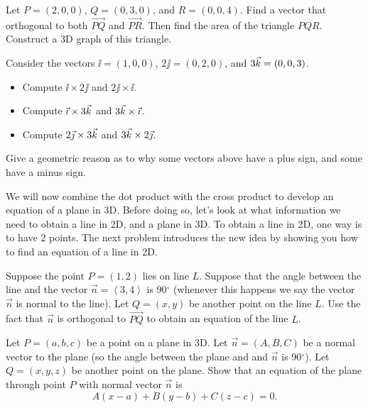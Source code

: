 \begin{problem}  
Let $P=(2,0,0)$, $Q=(0,3,0)$, and $R=(0,0,4)$. Find a vector that orthogonal to both $\vec {PQ}$ and $\vec {PR}$. Then find the area of the triangle $PQR$. Construct a 3D graph of this triangle.
\end{problem}

\begin{problem} 
Consider the vectors ${\ii}=(1,0,0)$, ${2\jj}=(0,2,0)$, and ${3\vec k}=(0,0,3)$.
\begin{itemize}
\item Compute $\ii\times {2\jj}$ and ${2\jj}\times {\ii}$.
\item Compute ${\vec \imath}\times {3\ensuremath{\vec k}}$ and ${3\vec k}\times {\ensuremath{\vec \imath}}$.
\item Compute ${2\vec \jmath}\times {3\ensuremath{\vec k}}$ and ${3\vec k}\times {2\ensuremath{\vec \jmath}}$.
\end{itemize}
Give a geometric reason as to why some vectors above have a plus sign, and some have a minus sign.
\end{problem}

We will now combine the dot product with the cross product to develop an equation of a plane in 3D. 
Before doing so, let's look at what information we need to obtain a line in 2D, and a plane in 3D.  
To obtain a line in 2D, one way is to have 2 points. 
The next problem introduces the new idea by showing you how to find an equation of a line in 2D. 

\begin{problem}\label{plane equation normal point}
Suppose the point $P=(1,2)$ lies on line $L$. Suppose that the angle between the line and the vector $\vec n=\left<3,4\right>$ is 90$^\circ$ (whenever this happens we say the vector $\vec n$ is normal to the line). Let $Q=(x,y)$ be another point on the line $L$. Use the fact that $\vec n$ is orthogonal to $\vec {PQ}$ to obtain an equation of the line $L$. 
\end{problem}


\begin{problem}\label{plane equation three points}%
Let $P=(a,b,c)$ be a point on a plane in 3D. Let $\vec n=(A,B,C)$ be a normal vector to the plane (so the angle between the plane and and $\vec n$ is 90$^\circ$).  Let $Q=(x,y,z)$ be another point on the plane.  Show that an equation of the plane through point $P$ with normal vector $\vec n$ is $$A(x-a)+B(y-b)+C(z-c)=0.$$
\end{problem}

